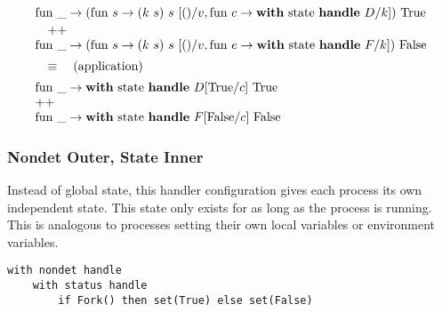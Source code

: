 \documentclass[logo,bsc,singlespacing,parskip]{infthesis}
\begin{document}
\[\begin{array}{l}
\text{fun } \_ \rightarrow (\text{fun } s \rightarrow (k\ s)\ s\ [()/v, \text{fun } c \rightarrow \text{\textbf{with} state \textbf{handle} }D/k])\ \text{True} \\[2pt]
\quad ++ \\ \text{fun } \_ \rightarrow (\text{fun } s \rightarrow (k\ s)\ s\ [()/v,  \text{fun } e \rightarrow \text{\textbf{with} state \textbf{handle} }F/k])\ \text{False} \\[5pt]
\quad\equiv\quad (\text{application}) \\[5pt]
\text{fun } \_ \rightarrow \text{\textbf{with} state \textbf{handle} } D[\text{True}/c]\ \text{True} \\
++ \\
\text{fun } \_ \rightarrow \text{\textbf{with} state \textbf{handle} } F[\text{False}/c]\ \text{False}
\end{array}
\]




\subsubsection*{Nondet Outer, State Inner}

Instead of global state, this handler configuration gives each process its own independent state. This state only exists for as long as the process is running. This is analogous to processes setting their own local variables or environment variables. 

\begin{verbatim}
with nondet handle
    with status handle
        if Fork() then set(True) else set(False)
\end{verbatim}
\end{document}
